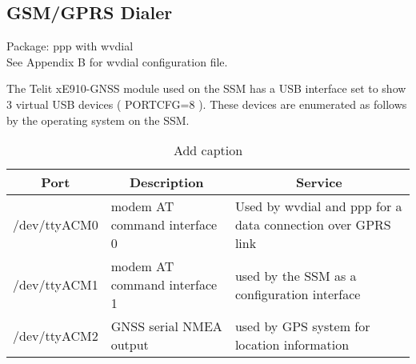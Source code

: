 \subsection{GSM/GPRS Dialer}
Package: 	ppp with wvdial\\
See Appendix B for wvdial configuration file.


The Telit xE910-GNSS module used on the SSM has a USB interface set to show 3 virtual USB devices ( PORTCFG=8 ). These devices are enumerated as follows by the operating system on the SSM.

\begin{table}[htbp]
  \centering
  \caption{Add caption}
    \begin{tabular}{rrr}
    \multicolumn{1}{c}{\textbf{Port}} & \multicolumn{1}{c}{\textbf{Description}} & \multicolumn{1}{c}{\textbf{Service}} \bigstrut[b]\\
    \hline
    \multicolumn{1}{l}{/dev/ttyACM0} & \multicolumn{1}{l}{modem AT command interface 0} & \multicolumn{1}{l}{Used by wvdial and ppp for a data connection over GPRS link} \bigstrut\\
    \hline
    \multicolumn{1}{l}{/dev/ttyACM1} & \multicolumn{1}{l}{modem AT command interface 1} & \multicolumn{1}{l}{used by the SSM as a configuration interface} \bigstrut\\
    \hline
    \multicolumn{1}{l}{/dev/ttyACM2} & \multicolumn{1}{l}{GNSS serial NMEA output} & \multicolumn{1}{l}{used by GPS system for location information} \bigstrut\\
    \hline
    \end{tabular}%
  \label{tab:addlabel}%
\end{table}%



